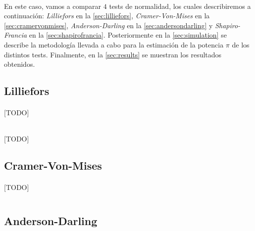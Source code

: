\documentclass[a4paper, spanish]{article}
\begin{document}
    \paragraph{}
    En este caso, vamos a comparar $4$ tests de normalidad, los cuales describiremos a continuación: \emph{Lilliefors} en la \autoref{sec:lilliefors}, \emph{Cramer-Von-Mises} en la \autoref{sec:cramervonmises}, \emph{Anderson-Darling} en la
    \autoref{sec:andersondarling} y \emph{Shapiro-Francia} en la \autoref{sec:shapirofrancia}. Posteriormente en la \autoref{sec:simulation} se describe la metodología llevada a cabo para la estimación de la potencia $\pi$ de los distintos tests. Finalmente, en la \autoref{sec:results} se muestran los resultados obtenidos.

    \subsection{Lilliefors}
    \label{sec:lilliefors}

      \paragraph{}
      [TODO]

      \begin{equation}
      \label{eq:test_lilliefors}
      \end{equation}

      \paragraph{}
      [TODO]

    \subsection{Cramer-Von-Mises}
    \label{sec:cramervonmises}
      \paragraph{}
      [TODO]

      \begin{equation}
      \label{eq:test_cramervonmises}
      \end{equation}

    \subsection{Anderson-Darling}
    \label{sec:andersondarling}
\end{document}
